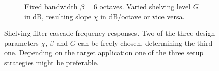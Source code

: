 \begin{figure}
\begin{subfigure}{0.8\textwidth}
\caption{Fixed bandwidth $\beta=6$ octaves. Varied shelving level $G$ in dB,
resulting slope $\chi$ in dB/octave or vice versa.}
\label{fig:low-shelving-filter-varying-gain}
\end{subfigure}
%
\caption{Shelving filter cascade frequency responses.
Two of the three design parameters $\chi$, $\beta$ and $G$
can be freely chosen, determining the third one. Depending on the target
application one of the three setup strategies might be preferable.}
\label{fig:shelving_filter_setup_cases}
\end{figure}
